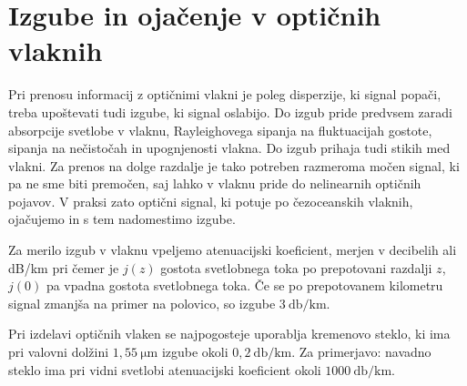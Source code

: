 \section{Izgube in ojačenje v optičnih vlaknih}
Pri prenosu informacij z optičnimi vlakni je poleg disperzije, ki signal popači,
treba upoštevati tudi izgube, ki signal oslabijo. 
Do izgub pride predvsem zaradi absorpcije svetlobe v vlaknu,
Rayleighovega sipanja na fluktuacijah gostote, 
sipanja na nečistočah in upognjenosti vlakna. Do izgub prihaja tudi stikih 
med vlakni. Za prenos na dolge
razdalje je tako potreben razmeroma močen signal, ki pa ne sme biti premočen,
saj lahko v vlaknu pride do nelinearnih optičnih pojavov. V praksi zato 
optični signal, ki potuje po čezoceanskih vlaknih, ojačujemo in s tem nadomestimo
izgube.

Za merilo izgub v vlaknu vpeljemo atenuacijski 
koeficient, merjen v decibelih ali dB/km
pri čemer je $j(z)$ gostota svetlobnega toka po prepotovani razdalji $z$, $j(0)$ pa
vpadna gostota svetlobnega toka. Če se po prepotovanem
kilometru signal zmanjša na primer na polovico, so izgube $3~\si{\decibel/\kilo\meter}$.

Pri izdelavi optičnih vlaken se najpogosteje uporablja kremenovo steklo, ki 
ima pri valovni dolžini $1,55~\si{\micro\meter}$ izgube okoli 
$0,2~\si{\decibel/\kilo\meter}$.  
Za primerjavo: navadno steklo ima pri vidni svetlobi atenuacijski koeficient okoli 
$1000~\si{\decibel/\kilo\meter}$.

